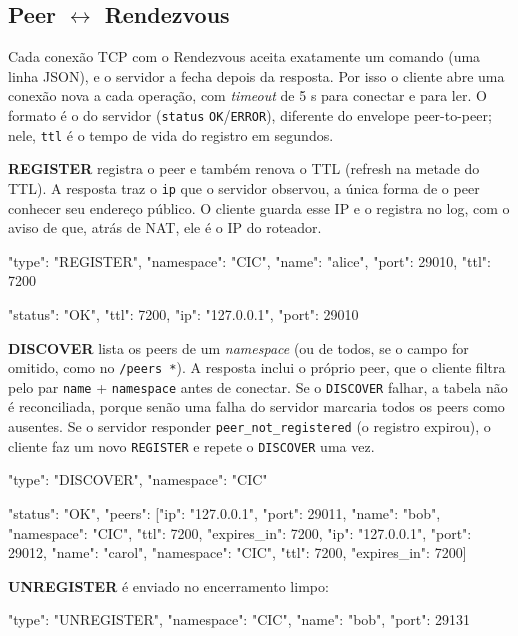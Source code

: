 \documentclass[11pt,a4paper]{article}
\begin{document}
\subsection{Peer \texorpdfstring{$\leftrightarrow$}{<->} Rendezvous}\label{sec:rdv}
Cada conexão TCP com o Rendezvous aceita exatamente um comando (uma linha JSON), e o servidor a fecha depois da resposta. Por isso o cliente abre uma conexão nova a cada operação, com \emph{timeout} de 5 s para conectar e para ler. O formato é o do servidor (\texttt{status} \texttt{OK}/\texttt{ERROR}), diferente do envelope peer-to-peer; nele, \texttt{ttl} é o tempo de vida do registro em segundos.

\textbf{REGISTER} registra o peer e também renova o TTL (refresh na metade do TTL). A resposta traz o \texttt{ip} que o servidor observou, a única forma de o peer conhecer seu endereço público. O cliente guarda esse IP e o registra no log, com o aviso de que, atrás de NAT, ele é o IP do roteador.
\begin{codigo}
{
  "type": "REGISTER",
  "namespace": "CIC",
  "name": "alice",
  "port": 29010,
  "ttl": 7200
}
\end{codigo}
\begin{codigo}
{
  "status": "OK",
  "ttl": 7200,
  "ip": "127.0.0.1",
  "port": 29010
}
\end{codigo}
\textbf{DISCOVER} lista os peers de um \emph{namespace} (ou de todos, se o campo for omitido, como no \texttt{/peers *}). A resposta inclui o próprio peer, que o cliente filtra pelo par \texttt{name} + \texttt{namespace} antes de conectar. Se o \texttt{DISCOVER} falhar, a tabela não é reconciliada, porque senão uma falha do servidor marcaria todos os peers como ausentes. Se o servidor responder \texttt{peer\_not\_registered} (o registro expirou), o cliente faz um novo \texttt{REGISTER} e repete o \texttt{DISCOVER} uma vez.
\begin{codigo}
{
  "type": "DISCOVER",
  "namespace": "CIC"
}
\end{codigo}
\begin{codigo}
{
  "status": "OK",
  "peers": [{"ip": "127.0.0.1", "port": 29011, "name": "bob", "namespace": "CIC", "ttl": 7200,
      "expires_in": 7200}, {"ip": "127.0.0.1", "port": 29012, "name": "carol", "namespace": "CIC",
      "ttl": 7200, "expires_in": 7200}]
}
\end{codigo}
\textbf{UNREGISTER} é enviado no encerramento limpo:
\begin{codigo}
{
  "type": "UNREGISTER",
  "namespace": "CIC",
  "name": "bob",
  "port": 29131
}
\end{codigo}
\end{document}
